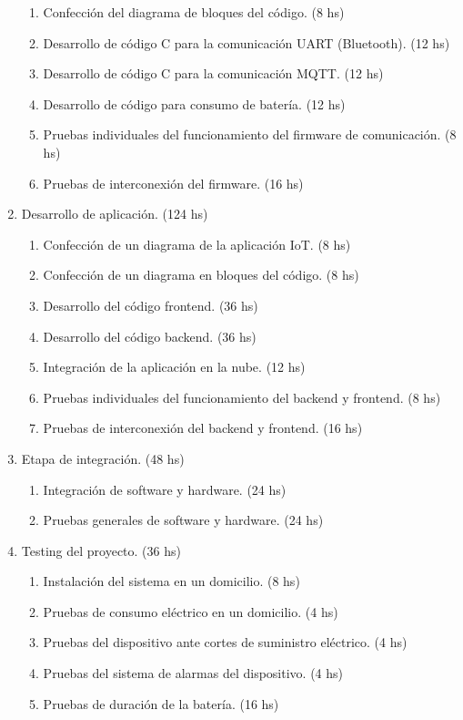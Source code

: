 \documentclass[
11pt, %
]{charter}
\begin{document}
\begin{enumerate}
\begin{enumerate}
	\item Confección del diagrama de bloques del código. (8 hs)
	\item Desarrollo de código C para la comunicación UART (Bluetooth). (12 hs)
	\item Desarrollo de código C para la comunicación MQTT.	(12 hs)
	\item Desarrollo de código para consumo de batería.	(12 hs)
	\item Pruebas individuales del funcionamiento del firmware de comunicación. (8 hs)
	\item Pruebas de interconexión del firmware. (16 hs)
	\end{enumerate}
\item Desarrollo de aplicación. (124 hs)
	\begin{enumerate}
	\item Confección de un diagrama de la aplicación IoT. (8 hs)
	\item Confección de un diagrama en bloques del código. (8 hs)
	\item Desarrollo del código frontend. (36 hs)
	\item Desarrollo del código backend. (36 hs)
	\item Integración de la aplicación en la nube. (12 hs)
	\item Pruebas individuales del funcionamiento del backend y frontend. (8 hs)
	\item Pruebas de interconexión del backend y frontend. (16 hs)
	\end{enumerate}

\item Etapa de integración. (48 hs)
	\begin{enumerate}
	\item Integración de software y  hardware. (24 hs)
	\item Pruebas generales de software y  hardware. (24 hs)
	\end{enumerate}
	
\item Testing del proyecto. (36 hs)
	\begin{enumerate}
	\item Instalación del sistema en un domicilio. (8 hs)
	\item Pruebas de consumo eléctrico en un domicilio.	(4 hs)
	\item Pruebas del dispositivo ante cortes de suministro eléctrico.	(4 hs)
	\item Pruebas del sistema de alarmas del dispositivo. (4 hs)
	\item Pruebas de duración de la batería. (16 hs)
	\end{enumerate}
	

\end{enumerate}
\end{document}
